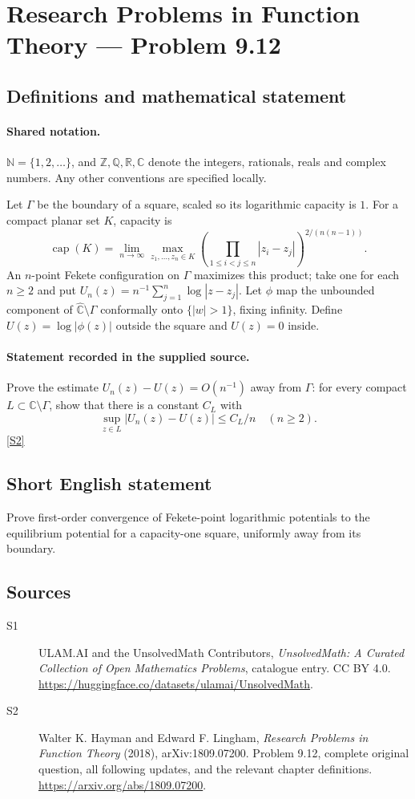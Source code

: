 \documentclass[11pt]{book}
\newcommand{\sref}[2]{\hyperlink{source:#1:#2}{[S#2]}}
\begin{document}
\section{Research Problems in Function Theory — Problem 9.12}\label{statement}

\subsection{Definitions and mathematical statement}

\paragraph{Shared notation.}$\mathbb N=\{1,2,\ldots\}$, and $\mathbb Z,\mathbb Q,\mathbb R,\mathbb C$ denote the integers, rationals, reals and complex numbers. Any other conventions are specified locally.


Let $\Gamma$ be the boundary of a square, scaled so its logarithmic capacity is $1$. For a compact planar set $K$, capacity is \[\operatorname{cap}(K)=\lim_{n\to\infty}\max_{z_1,\ldots,z_n\in K}\left(\prod_{1\le i<j\le n}|z_i-z_j|\right)^{2/(n(n-1))}.\] An $n$-point Fekete configuration on $\Gamma$ maximizes this product; take one for each $n\ge2$ and put $U_n(z)=n^{-1}\sum_{j=1}^n\log|z-z_j|$. Let $\phi$ map the unbounded component of $\widehat{\mathbb C}\setminus\Gamma$ conformally onto $\{|w|>1\}$, fixing infinity. Define $U(z)=\log|\phi(z)|$ outside the square and $U(z)=0$ inside.
\paragraph{Statement recorded in the supplied source.}
Prove the estimate $U_n(z)-U(z)=O(n^{-1})$ away from $\Gamma$: for every compact $L\subset\mathbb C\setminus\Gamma$, show that there is a constant $C_L$ with \[\sup_{z\in L}|U_n(z)-U(z)|\le C_L/n\quad(n\ge2).\] \sref{statement}{2}
\subsection{Short English statement}
Prove first-order convergence of Fekete-point logarithmic potentials to the equilibrium potential for a capacity-one square, uniformly away from its boundary.
\subsection{Sources}
\begin{description}
\item[\hypertarget{source:statement:1}{S1}] ULAM.AI and the UnsolvedMath Contributors, \emph{UnsolvedMath: A Curated Collection of Open Mathematics Problems}, catalogue entry. CC BY 4.0. \url{https://huggingface.co/datasets/ulamai/UnsolvedMath}.
\item[\hypertarget{source:statement:2}{S2}] Walter K. Hayman and Edward F. Lingham, \emph{Research Problems in Function Theory} (2018), arXiv:1809.07200. Problem 9.12, complete original question, all following updates, and the relevant chapter definitions. \url{https://arxiv.org/abs/1809.07200}.
\end{description}
\label{end:statement}
\end{document}
